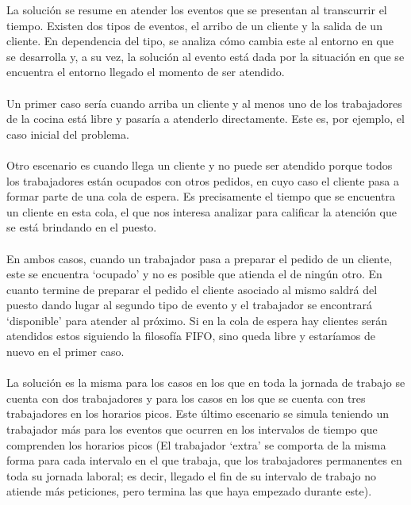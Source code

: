 \documentclass{article}
\begin{document}
La solución se resume en atender los eventos que se presentan al transcurrir el tiempo. Existen dos tipos de eventos, 
el arribo de un cliente y la salida de un cliente. En dependencia del tipo, se analiza cómo cambia este al entorno 
en que se desarrolla y, a su vez, la solución al evento está dada por la situación en que se encuentra el entorno 
llegado el momento de ser atendido.
\paragraph{}
Un primer caso sería cuando arriba un cliente y al menos uno de los trabajadores de la cocina está libre y pasaría a 
atenderlo directamente. Este es, por ejemplo, el caso inicial del problema.
\paragraph{}
Otro escenario es cuando llega un cliente y no puede ser atendido porque todos los trabajadores están ocupados con 
otros pedidos, en cuyo caso el cliente pasa a formar parte de una cola de espera. Es precisamente el tiempo que se 
encuentra un cliente en esta cola, el que nos interesa analizar para calificar la atención que se está brindando 
en el puesto.
\paragraph{}
En ambos casos, cuando un trabajador pasa a preparar el pedido de un cliente, este se encuentra ‘ocupado’ y no es 
posible que atienda el de ningún otro. En cuanto termine de preparar el pedido el cliente asociado al mismo saldrá del puesto 
dando lugar al segundo tipo de evento y el trabajador se encontrará ‘disponible’ para atender al próximo. Si en la 
cola de espera hay clientes serán atendidos estos siguiendo la filosofía FIFO, sino queda libre y estaríamos de 
nuevo en el primer caso.
\paragraph{}
La solución es la misma para los casos en los que en toda la jornada de trabajo se cuenta con dos trabajadores y para los 
casos en los que se cuenta con tres trabajadores en los horarios picos. Este último escenario se simula teniendo 
un trabajador más para los eventos que ocurren en los intervalos de tiempo que comprenden los horarios picos (El 
trabajador ‘extra’ se comporta de la misma forma para cada intervalo en el que trabaja, que los trabajadores 
permanentes en toda su jornada laboral; es decir, llegado el fin de su intervalo de trabajo no atiende más 
peticiones, pero termina las que haya empezado durante este).
\end{document}
